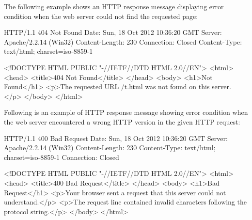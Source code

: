\documentclass[a4paper,11pt,bahasa]{extarticle}
\begin{document}
The following example shows an HTTP response message displaying error condition when
the web server could not find the requested page:

\begin{textcode}
HTTP/1.1 404 Not Found
Date: Sun, 18 Oct 2012 10:36:20 GMT
Server: Apache/2.2.14 (Win32)
Content-Length: 230
Connection: Closed
Content-Type: text/html; charset=iso-8859-1

<!DOCTYPE HTML PUBLIC "-//IETF//DTD HTML 2.0//EN">
<html>
<head>
   <title>404 Not Found</title>
</head>
<body>
   <h1>Not Found</h1>
   <p>The requested URL /t.html was not found on this server.</p>
</body>
</html>
\end{textcode}

Following is an example of HTTP response message showing error condition when the web
server encountered a wrong HTTP version in the given HTTP request:
\begin{textcode}
HTTP/1.1 400 Bad Request
Date: Sun, 18 Oct 2012 10:36:20 GMT
Server: Apache/2.2.14 (Win32)
Content-Length: 230
Content-Type: text/html; charset=iso-8859-1
Connection: Closed

<!DOCTYPE HTML PUBLIC "-//IETF//DTD HTML 2.0//EN">
<html>
<head>
   <title>400 Bad Request</title>
</head>
<body>
   <h1>Bad Request</h1>
   <p>Your browser sent a request that this server could not understand.</p>
   <p>The request line contained invalid characters following the protocol string.</p>
</body>
</html>
\end{textcode}
\end{document}
